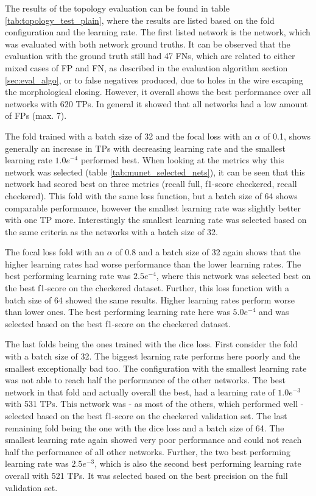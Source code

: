 The results of the topology evaluation can be found in table \ref{tab:topology_test_plain}, where the results are listed based on the fold configuration and the learning rate.
The first listed network is the network, which was evaluated with both network ground truths.
It can be observed that the evaluation with the ground truth still had 47 \acp{FN}, which are related to either mixed cases of \ac{FP} and \ac{FN}, as described in the evaluation algorithm section \ref{sec:eval_algo}, or to false negatives produced, due to holes in the wire escaping the morphological closing.
However, it overall shows the best performance over all networks with 620 \acp{TP}.
In general it showed that all networks had a low amount of \acp{FP} (max. 7).

The fold trained with a batch size of 32 and the focal loss with an $\alpha$ of 0.1, shows generally an increase in \acp{TP} with decreasing learning rate and the smallest learning rate $1.0e^{-4}$ performed best.
When looking at the metrics why this network was selected (table \ref{tab:munet_selected_nets}), it can be seen that this network had scored best on three metrics (recall full, f1-score checkered, recall checkered).
This fold with the same loss function, but a batch size of 64 shows comparable performance, however the smallest learning rate was slightly better with one \ac{TP} more.
Interestingly the smallest learning rate was selected based on the same criteria as the networks with a batch size of 32.

The focal loss fold with an $\alpha$ of 0.8 and a batch size of 32 again shows that the higher learning rates had worse performance than the lower learning rates.
The best performing learning rate was $2.5e^{-4}$, where this network was selected best on the best f1-score on the checkered dataset.
Further, this loss function with a batch size of 64 showed the same results.
Higher learning rates perform worse than lower ones.
The best performing learning rate here was $5.0e^{-4}$ and was selected based on the best f1-score on the checkered dataset.

The last folds being the ones trained with the dice loss.
First consider the fold with a batch size of 32.
The biggest learning rate performs here poorly and the smallest exceptionally bad too.
The configuration with the smallest learning rate was not able to reach half the performance of the other networks.
The best network in that fold and actually overall the best, had a learning rate of $1.0e^{-3}$ with 531 \acp{TP}.
This network was - as most of the others, which performed well - selected based on the best f1-score on the checkered validation set.
The last remaining fold being the one with the dice loss and a batch size of 64.
The smallest learning rate again showed very poor performance and could not reach half the performance of all other networks.
Further, the two best performing learning rate was $2.5e^{-3}$, which is also the second best performing learning rate overall with 521 \acp{TP}.
It was selected based on the best precision on the full validation set.



